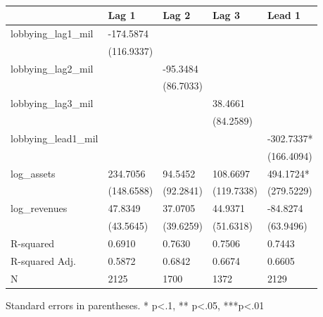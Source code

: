 \begin{table}
\caption{}
\label{}
\begin{center}
\begin{tabular}{lllll}
\hline
                     & Lag 1      & Lag 2     & Lag 3      & Lead 1      \\
\hline
lobbying\_lag1\_mil  & -174.5874  &           &            &             \\
                     & (116.9337) &           &            &             \\
lobbying\_lag2\_mil  &            & -95.3484  &            &             \\
                     &            & (86.7033) &            &             \\
lobbying\_lag3\_mil  &            &           & 38.4661    &             \\
                     &            &           & (84.2589)  &             \\
lobbying\_lead1\_mil &            &           &            & -302.7337*  \\
                     &            &           &            & (166.4094)  \\
log\_assets          & 234.7056   & 94.5452   & 108.6697   & 494.1724*   \\
                     & (148.6588) & (92.2841) & (119.7338) & (279.5229)  \\
log\_revenues        & 47.8349    & 37.0705   & 44.9371    & -84.8274    \\
                     & (43.5645)  & (39.6259) & (51.6318)  & (63.9496)   \\
R-squared            & 0.6910     & 0.7630    & 0.7506     & 0.7443      \\
R-squared Adj.       & 0.5872     & 0.6842    & 0.6674     & 0.6605      \\
N                    & 2125       & 1700      & 1372       & 2129        \\
\hline
\end{tabular}
\end{center}
\end{table}
\bigskip
Standard errors in parentheses. \newline 
* p<.1, ** p<.05, ***p<.01